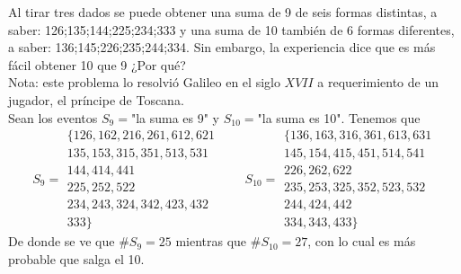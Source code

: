 \item Al tirar tres dados se puede obtener una suma de 9 de seis formas distintas, a saber: 126;135;144;225;234;333 y una suma de 10 también de 6 formas diferentes, a saber: 136;145;226;235;244;334. Sin embargo, la experiencia dice que es más fácil obtener 10 que 9 ¿Por qué?\\
Nota: este problema lo resolvió Galileo en el siglo $XVII$ a requerimiento de un jugador, el príncipe de Toscana.\e\\
    Sean los eventos $S_9=$"la suma es 9" y $S_{10}=$"la suma es 10". Tenemos que\[
    S_9=\begin{array}{l}
        \{126,162,216,261,612,621\\
        135,153,315,351,513,531\\
        144,414,441\\
        225,252,522\\
        234,243,324,342,423,432\\
        333\}
    \end{array}\qquad S_{10}=\begin{array}{l}
        \{136,163,316,361,613,631\\
        145,154,415,451,514,541\\
        226,262,622\\
        235,253,325,352,523,532\\
        244,424,442\\
        334,343,433\}
    \end{array}
    \]
    De donde se ve que $\#S_9=25$ mientras que $\#S_{10}=27$, con lo cual es más probable que salga el 10.